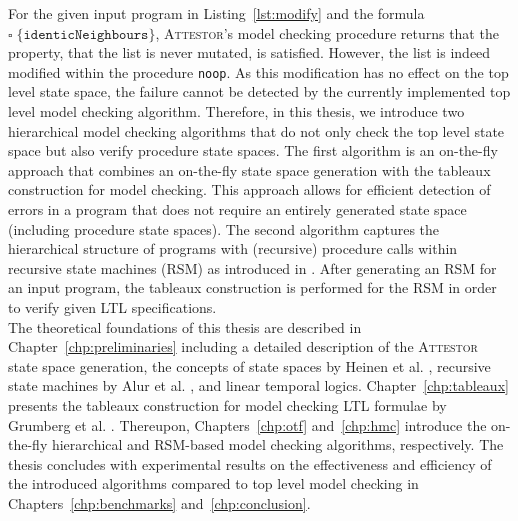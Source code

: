 \documentclass[a4paper, 12pt, twoside]{report}
\begin{document}
	For the given input program in Listing~\ref{lst:modify} and the formula $\square\;\{\texttt{identicNeighbours}\}$, \textsc{Attestor}'s model checking procedure returns that the property, that the list is never mutated, is satisfied. However, the list is indeed modified within the procedure \texttt{noop}. As this modification has no effect on the top level state space, the failure cannot be detected by the currently implemented top level model checking algorithm. Therefore, in this thesis, we introduce two hierarchical model checking algorithms that do not only check the top level state space but also verify procedure state spaces. The first algorithm is an on-the-fly approach that combines an on-the-fly state space generation with the tableaux construction for model checking. This approach allows for efficient detection of errors in a program that does not require an entirely generated state space (including procedure state spaces). The second algorithm captures the hierarchical structure of programs with (recursive) procedure calls within recursive state machines (RSM) as introduced in \cite{alur2001analysis}. After generating an RSM for an input program, the tableaux construction is performed for the RSM in order to verify given LTL specifications.\\	
	
	The theoretical foundations of this thesis are described in Chapter~\ref{chp:preliminaries} including a detailed description of the \textsc{Attestor} state space generation, the concepts of state spaces by Heinen et al. \cite{heinen2015juggrnaut}, recursive state machines by Alur et al. \cite{alur2001analysis}, and linear temporal logics. Chapter~\ref{chp:tableaux} presents the tableaux construction for model checking LTL formulae by Grumberg et al. \cite{bhat1995efficient}. Thereupon, Chapters~\ref{chp:otf} and~\ref{chp:hmc} introduce the on-the-fly hierarchical and RSM-based model checking algorithms, respectively. The thesis concludes with experimental results on the effectiveness and efficiency of the introduced algorithms compared to top level model checking in Chapters~\ref{chp:benchmarks} and~\ref{chp:conclusion}. 
\end{document}
